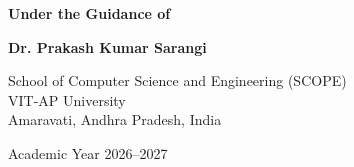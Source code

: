 \documentclass[12pt,a4paper]{article}
\begin{document}
\begin{titlepage}
\begin{center}
\vspace{1.0cm}

\textbf{Under the Guidance of}

\vspace{0.3cm}

\textbf{Dr. Prakash Kumar Sarangi}

\vspace{1.0cm}

{\large
School of Computer Science and Engineering (SCOPE)\\
VIT-AP University\\
Amaravati, Andhra Pradesh, India
}

\vspace{0.4cm}

{\large
Academic Year 2026--2027
}

\end{center}
\end{titlepage}
\end{document}
